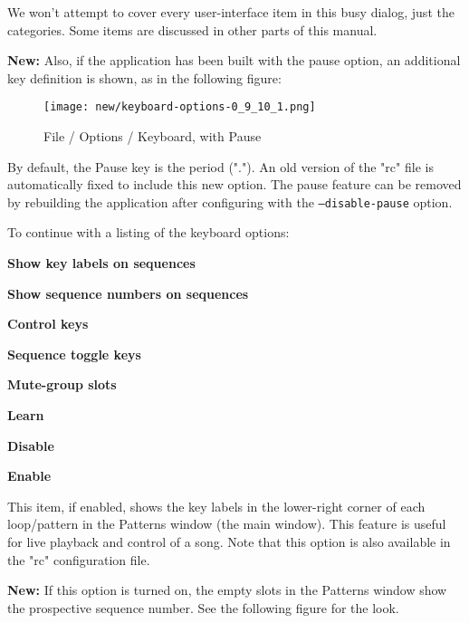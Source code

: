    We won't attempt to cover every user-interface item in this busy
   dialog, just the categories.  Some items are discussed in other parts of
   this manual.

   \textbf{New:}
   Also, if the application has been built with the pause option, an
   additional key definition is shown, as in the following figure:

\begin{figure}[H]
   \centering 
   \texttt{[image: new/keyboard-options-0\_9\_10\_1.png]}
   \caption{File / Options / Keyboard, with Pause}
   \label{fig:seq64_menu_file_options_keyboard_pause}
\end{figure}

   By default, the Pause key is the period (".").  An old version of
   the "rc" file is automatically fixed to include this new option.
   The pause feature can be removed by rebuilding the application
   after configuring with the \texttt{--disable-pause} option.

   To continue with a listing of the keyboard options:

   \begin{enumber}
      \item \textbf{Show key labels on sequences}
      \item \textbf{Show sequence numbers on sequences}
      \item \textbf{Control keys}
      \item \textbf{Sequence toggle keys}
      \item \textbf{Mute-group slots}
      \item \textbf{Learn}
      \item \textbf{Disable}
      \item \textbf{Enable}
   \end{enumber}

   \setcounter{ItemCounter}{0}      %

   This item, if enabled, shows the key labels in the lower-right corner of
   each loop/pattern in the Patterns window (the main window).  This feature is
   useful for live playback and control of a song.
   Note that this option is also available in the "rc" configuration file.

   \textbf{New:}
   If this option is turned on, the
   empty slots in the Patterns window show the prospective sequence number.
   See the following figure for the look.

